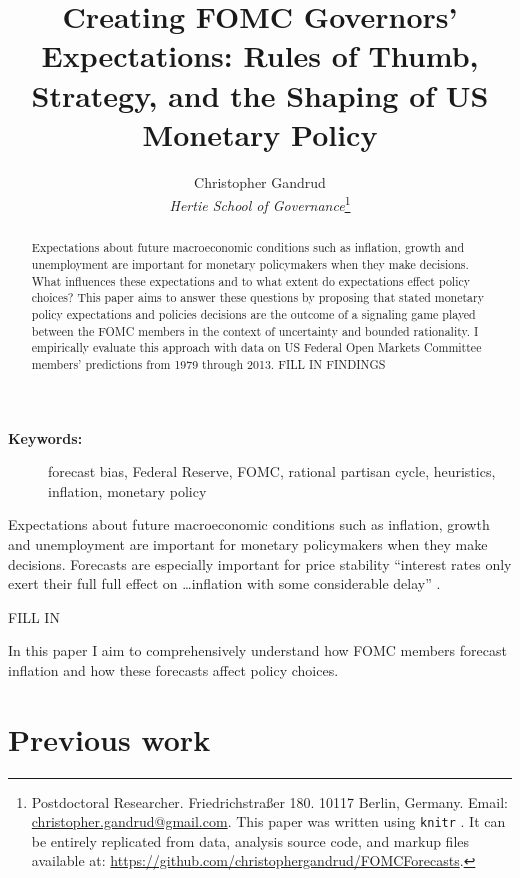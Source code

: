 \documentclass[a4paper]{article}\usepackage[]{graphicx}\usepackage[]{color}
\title{Creating FOMC Governors' Expectations: Rules of Thumb, Strategy, and the Shaping of US Monetary Policy}
\author{Christopher Gandrud \\
                {\emph{Hertie School of Governance}}\footnote{Postdoctoral Researcher. Friedrichstra{\ss}er 180. 10117 Berlin, Germany. Email: \href{mailto:christopher.gandrud@gmail.com}{christopher.gandrud@gmail.com}. This paper was written using {\tt{knitr}} \citep{R-knitr}. It can be entirely replicated from data, analysis source code, and markup files available at: {\url{https://github.com/christophergandrud/FOMCForecasts}}.}}
\begin{document}
\maketitle

\begin{abstract}
    Expectations about future macroeconomic conditions such as inflation, growth and unemployment are important for monetary policymakers when they make decisions. What influences these expectations and to what extent do expectations effect policy choices? This paper aims to answer these questions by proposing that stated monetary policy expectations and policies decisions are the outcome of a signaling game played between the FOMC members in the context of uncertainty and bounded rationality. I empirically evaluate this approach with data on US Federal Open Markets Committee members' predictions from 1979 through 2013. FILL IN FINDINGS
\end{abstract}

\begin{description}
  \item [{\textbf{Keywords:}}] forecast bias, Federal Reserve, FOMC, rational partisan cycle, heuristics, inflation, monetary policy
\end{description}


Expectations about future macroeconomic conditions such as inflation, growth and unemployment are important for monetary policymakers when they make decisions. Forecasts are especially important for price stability ``interest rates only exert their full full effect on \ldots inflation with some considerable delay'' \cite[59]{Goodhart2001}.

FILL IN

In this paper I aim to comprehensively understand how FOMC members forecast inflation and how these forecasts affect policy choices.

\section{Previous work}
\end{document}

